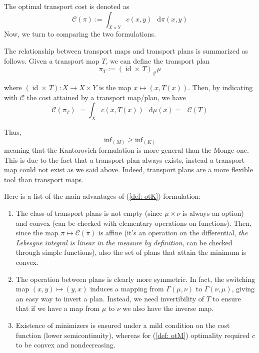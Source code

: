 \documentclass[a4paper,12pt,reqno]{amsbook}
\theoremstyle{definition} %
\newcommand*\de{\mathop{}\!\mathrm{d}}
\newcommand{\1}{\mathbbm{1}}
\DeclareMathOperator*{\id}{id}
\theoremstyle{plain}
\theoremstyle{remark}
\begin{document}
The optimal transport cost is denoted as
\begin{equation}\label{eq: cost}
    \mathscr{C}(\pi) := \int_{X\times Y} c(x,y) \, \de{\pi(x,y)}
\end{equation}
Now, we turn to comparing the two formulations. 

The relationship between transport maps and transport plans is summarized as follows. Given a transport map $T$, we can define the transport plan
\begin{equation}\label{eq: pit}
    \pi_T := (\id \times\, T)_\#\mu
\end{equation}


where $(\id \times\, T): X \to X \times Y$ is the map $x \mapsto (x, T(x))$. Then, by indicating with $\mathscr{C}$ the cost attained by a transport map/plan, we have 
\[
\mathscr{C}(\pi_T) \,\, =\int_X c(x, T(x)) \, \de{\mu}(x) = \,\, \,\,\mathscr{C}(T)
\]

Thus, 
\[
\text{inf}_{(M)} \ge \text{inf}_{(K)}
\]
meaning that the Kantorovich formulation is more general than the Monge one. This is due to the fact that a transport plan always exists, instead a transport map could not exist as we said above. Indeed, transport plans are a more flexible tool than transport maps. 

Here is a list of the main advantages of (\ref{def: otK}) formulation:
\begin{enumerate}[label=($\roman*$)]
    \item  The class of transport plans is not empty (since $\mu \times \nu$ is always an option) and convex (can be checked with elementary operations on functions). Then, since the map $\pi \mapsto \mathscr{C}(\pi)$ is affine (it's an operation on the differential, \textit{the Lebesgue integral is linear in the measure by definition}, can be checked through simple functions), also the set of plans that attain the minimum is convex. 
    \item  The operation between plans is clearly more symmetric. In fact, the switching map $(x,y) \mapsto (y,x)$ induces a mapping from $\Gamma(\mu, \nu)$ to $\Gamma(\nu, \mu)$, giving an easy way to invert a plan. Instead, we need invertibility of $T$ to ensure that if we have a map from $\mu$ to $\nu$ we also have the inverse map. 
    \item  Existence of minimizers is ensured under a mild condition on the cost function (lower semicontinuity), whereas for (\ref{def: otM}) optimality required $c$ to be convex and nondecreasing.
\end{enumerate}
\end{document}
